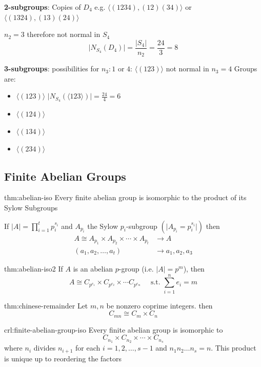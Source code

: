 \documentclass{article}
\begin{document}
\textbf{2-subgroups}: Copies of $D_{4}$ e.g. $\langle (1234), (12)(34) \rangle$ or $\langle (1324), (13)(24) \rangle$

$n_{2} = 3$ therefore not normal in $S_{4}$
\[\lvert N_{S_{4}}(D_{4}) \rvert = \frac{\lvert S_{4} \rvert}{n_{2}} = \frac{24}{3} = 8\]

\textbf{3-subgroups}: possibilities for $n_{3}: 1 \text{ or } 4$: $\langle (123) \rangle$ not normal in $n_{3} = 4$
Groups are:
\begin{itemize}
    \item $\langle (123) \rangle$ $\lvert N_{S_{4}}(\langle 123 \rangle) \rvert = \frac{24}{4} = 6$
    \item $\langle (124) \rangle$
    \item $\langle (134) \rangle$
    \item $\langle (234) \rangle$
\end{itemize}

\subsection{Finite Abelian Groups}

\begin{thm}[]{thm:abelian-iso}{}
    Every finite abelian group is isomorphic to the product of its Sylow Subgroups
\end{thm}

If $\lvert A \rvert = \prod_{i = 1}^{t} p_{i}^{s_{i}}$ and $A_{p_{i}}$ the Sylow $p_{i}$-subgroup $(\lvert A_{p_{i}} = p_{i}^{s_{i}} \rvert)$ then
\begin{align*}
    A \cong A_{p_{1}} \times A_{p_{2}} \times \cdots \times A_{p_{t}} &\to A\\
    (a_{1},a_{2},\dots,a_{t}) &\to a_{1},a_{2},a_{3}
\end{align*}

\begin{thm}[]{thm:abelian-iso2}{}
    If $A$ is an abelian $p$-group (i.e. $\lvert A \rvert = p^{m}$), then
    \[A \cong C_{p^{e_{1}}} \times C_{p^{e_{2}}} \times \cdots C_{p^{e_{m}}} \quad \text{ s.t. } \sum_{i = 1}^{n} e_{i} = m\]
\end{thm}

\begin{thm}{thm:chinese-remainder}{}
    Let $m,n$ be nonzero coprime integers. then
    \[C_{mn} \cong C_{m} \times C_{n}\]
\end{thm}

\begin{crl}{crl:finite-abelian-group-iso}{}
    Every finite abelian group is isomorphic to
    \[C_{n_{1}} \times C_{n_{2}} \times \cdots \times C_{n_{s}}\]
    where $n_{i}$ divides $n_{i+1}$ for each $i = 1,2,\dots,s - 1$ and $n_{1}n_{2}\dots n_{s} = n$. This product is unique up to reordering the factors
\end{crl}
\end{document}
